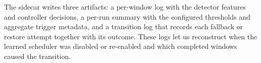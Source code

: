 The sidecar writes three artifacts: a per-window log with the detector features and controller decisions, a per-run summary with the configured thresholds and
aggregate trigger metadata, and a transition log that records each fallback or restore attempt together with its outcome. These logs let us reconstruct
when the learned scheduler was disabled or re-enabled and which completed windows caused the transition.

\fi